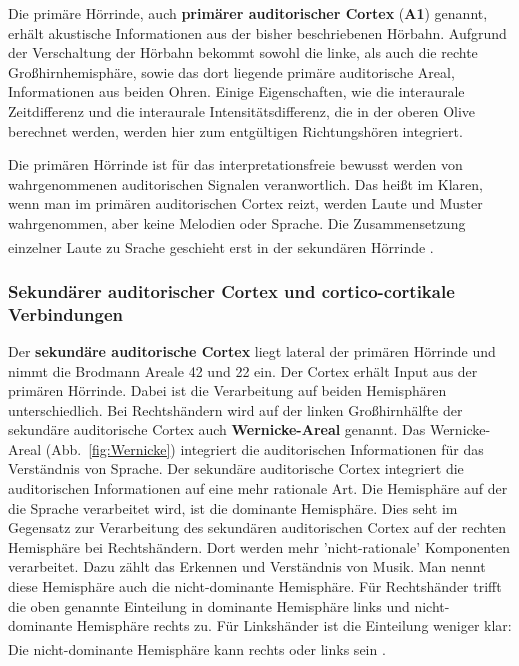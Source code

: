 \documentclass[12pt,a4paper,pdftex]{article}
\begin{document}
Die primäre Hörrinde, auch \textbf{primärer auditorischer Cortex} (\textbf{A1}) genannt, erhält akustische Informationen aus der bisher beschriebenen Hörbahn. Aufgrund der Verschaltung der Hörbahn bekommt sowohl die linke, als auch die rechte Großhirnhemisphäre, sowie das dort liegende primäre auditorische Areal, Informationen aus beiden Ohren. Einige Eigenschaften, wie die interaurale Zeitdifferenz und die interaurale Intensitätsdifferenz, die in der oberen Olive berechnet werden, werden hier zum entgültigen Richtungshören integriert. 

Die primären Hörrinde ist für das interpretationsfreie bewusst werden von wahrgenommenen auditorischen Signalen veranwortlich. Das heißt im Klaren, wenn man im primären auditorischen Cortex reizt, werden Laute und Muster wahrgenommen, aber keine Melodien oder Sprache. Die Zusammensetzung einzelner Laute zu Srache geschieht erst in der sekundären Hörrinde \textsuperscript{\cite[9.9]{trepel2011neuroanatomie}}.

\subsubsection*{Sekundärer auditorischer Cortex und cortico-cortikale Verbindungen}

Der \textbf{sekundäre auditorische Cortex}  liegt lateral der primären Hörrinde und nimmt die Brodmann Areale 42 und 22 ein. Der Cortex erhält Input aus der primären Hörrinde. Dabei ist die Verarbeitung auf beiden Hemisphären unterschiedlich. Bei Rechtshändern wird auf der linken Großhirnhälfte der sekundäre auditorische Cortex auch \textbf{Wernicke-Areal}  genannt. Das Wernicke-Areal (Abb.~\ref{fig:Wernicke}) integriert die auditorischen Informationen für das Verständnis von Sprache. Der sekundäre auditorische Cortex integriert die auditorischen Informationen auf eine mehr rationale Art. Die Hemisphäre auf der die Sprache verarbeitet wird, ist die dominante Hemisphäre. Dies seht im Gegensatz zur Verarbeitung des sekundären auditorischen Cortex auf der rechten Hemisphäre bei Rechtshändern. Dort werden mehr 'nicht-rationale' Komponenten verarbeitet. Dazu zählt das Erkennen und Verständnis von Musik. Man nennt diese Hemisphäre auch die nicht-dominante Hemisphäre. Für Rechtshänder trifft die oben genannte Einteilung in dominante Hemisphäre links und nicht-dominante Hemisphäre rechts zu. Für Linkshänder ist die Einteilung weniger klar: Die nicht-dominante Hemisphäre kann rechts oder links sein \textsuperscript{\cite{trepel2011neuroanatomie}}.
\end{document}
